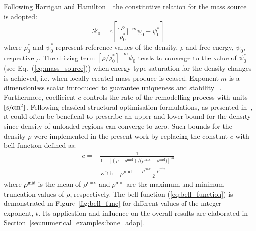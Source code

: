 \documentclass[11pt]{acmeArticle}
\numberwithin{equation}{section}
\begin{document}
Following Harrigan and Hamilton~\citep{Harrigan1993}, the constitutive relation for the mass source is adopted:
\begin{equation}
\mathcal{R}_{0}=c\left[\Biggl[\frac{\rho}{\rho_{0}^{\ast}}\Biggr]^{-m}\psi_{0}-\psi_{0}^{\ast}\right]
\label{eq:mass_source}
\end{equation}
where $\rho_0^\ast$ and $\psi_{0}^\ast$ represent reference values of the density, $\rho$ and free energy, $\psi_0$, respectively.  
The driving term $\left[ \rho / \rho_0^\ast \right]^{-m}\psi_0$ tends to converge to the value of $\psi_{0}^\ast$ (see Eq.~(\ref{eq:mass_source})) when energy-type saturation for the density changes is achieved, i.e. when locally created mass produce is ceased. 
Exponent $m$ is a dimensionless scalar introduced to guarantee uniqueness and stability~\citep{Harrigan1993} . 
Furthermore, coefficient $c$ controls the rate of the remodelling process with units~$[\rm{s/cm^2}]$. 
Following classical structural optimisation formulations, as presented in~\citep{Waffenschmidt2012}, it could often be beneficial to prescribe an upper and lower bound for the density
since density of unloaded regions can converge to zero.
Such bounds for the density $\rho$ were implemented in the present work by replacing the constant $c$ with bell function defined as:
\begin{equation}
\begin{aligned}
c = & \frac{1}{1 + \left[  (\rho - \rho^{\mathrm{mid}}) / (\rho{^\mathrm{max}} - \rho{^\mathrm{mid})} \right]^{2 b}}\\
& \mathrm{with} \quad \rho^{\mathrm{mid}} = \frac{\rho{^\mathrm{max}} + \rho{^\mathrm{min}}}{2}
\end{aligned}
\label{eq:bell_function}
\end{equation}
where $\rho^{\rm {mid}}$ is the mean of $\rho{^\mathrm{max}}$ and $\rho{^\mathrm{min}}$ are the maximum and minimum truncation values of $\rho$, respectively.
The bell function (\ref{eq:bell_function}) is demonstrated in Figure~\ref{fig:bell_func} for different values of the integer exponent, $b$. 
Its application and influence on the overall results are elaborated in Section~\ref{sec:numerical_examples:bone_adap}.
\end{document}
